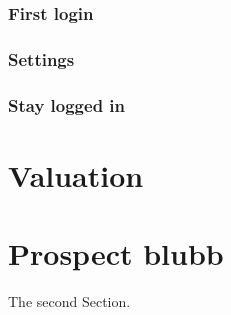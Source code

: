 \documentclass[11pt,a4paper,oneside]{report}
\begin{document}
\subsection{First login}

\subsection{Settings}

\subsection{Stay logged in}

\chapter{Valuation}

\chapter{Prospect blubb}


The second Section.\\
\end{document}
